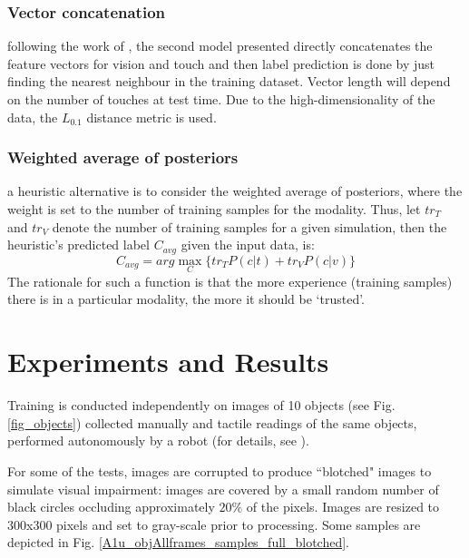 \documentclass[letterpaper, 10 pt, conference]{ieeeconf}  %
\begin{document}
\subsubsection{Vector concatenation}
following the work of \cite{Yang2015}, the second model presented directly concatenates the feature vectors for vision and touch and then label prediction is done by just finding the nearest neighbour in the training dataset. Vector length will depend on the number of touches at test time. Due to the high-dimensionality of the data, the $L_{0.1}$ distance metric \cite{Aggarwal2001} is used.
\subsubsection{Weighted average of posteriors}
a heuristic alternative is to consider the weighted average of posteriors, where the weight is set to the number of training samples for the modality. Thus, let $tr_T$ and $tr_V$ denote the number of training samples for a given simulation, then the heuristic's predicted label $C_{avg}$ given the input data, is:
\begin{equation}
C_{avg} = arg\max_C \{tr_T P(c|t) + tr_V P(c|v)\}
\end{equation}
The rationale for such a function is that the more experience (training samples) there is in a particular modality, the more it should be `trusted'.

\section{Experiments and Results}
Training is conducted independently on images of 10 objects (see Fig. \ref{fig_objects}) collected manually and tactile readings of the same objects, performed autonomously by a robot (for details, see \cite{Corradi2015}). 

\begin{figure}
	\centering
\end{figure}

For some of the tests, images are corrupted to produce ``blotched" images to simulate visual impairment: images are covered by a small random number of black circles occluding approximately $20\%$ of the pixels. Images are resized to 300x300 pixels and set to gray-scale prior to processing. Some samples are depicted in Fig. \ref{A1u_objAllframes_samples_full_blotched}.
\end{document}
